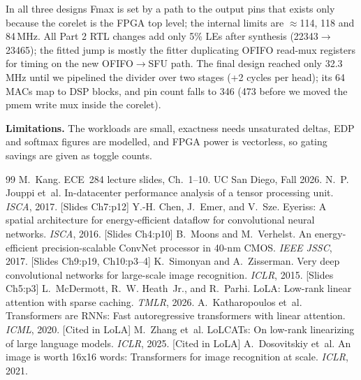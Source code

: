 \documentclass{article}
\begin{document}
In all three designs Fmax is set by a path to the output pins that exists only because the corelet is the FPGA top level; the
internal limits are $\approx$114, 118 and 84\,MHz. All Part 2 RTL changes add only 5\% LEs after synthesis
(\num{22343}$\to$\num{23465}); the fitted jump is mostly the fitter duplicating OFIFO read-mux registers for timing on the
new OFIFO$\to$SFU path. The final design reached
only 32.3\,MHz until we pipelined the divider over two stages (+2 cycles per head); its 64 MACs map to DSP blocks, and pin
count falls to 346 (473 before we moved the pmem write mux inside the corelet).

\textbf{Limitations.} The workloads are small, exactness needs unsaturated deltas, EDP and softmax figures are modelled, and
FPGA power is vectorless, so gating savings are given as toggle counts.

{\small
\begin{thebibliography}{99}\setlength{\itemsep}{1pt}
 M.~Kang. ECE~284 lecture slides, Ch.~1--10. UC San Diego, Fall 2026.
 N.~P. Jouppi et~al. In-datacenter performance analysis of a tensor processing unit. \emph{ISCA}, 2017. [Slides Ch7:p12]
 Y.-H. Chen, J.~Emer, and V.~Sze. Eyeriss: A spatial architecture for energy-efficient dataflow for
convolutional neural networks. \emph{ISCA}, 2016. [Slides Ch4:p10]
 B.~Moons and M.~Verhelst. An energy-efficient precision-scalable {ConvNet} processor in 40-nm {CMOS}.
\emph{IEEE JSSC}, 2017. [Slides Ch9:p19, Ch10:p3--4]
 K.~Simonyan and A.~Zisserman. Very deep convolutional networks for large-scale image recognition.
\emph{ICLR}, 2015. [Slides Ch5:p3]
 L.~McDermott, R.~W. Heath~Jr., and R.~Parhi. {LoLA}: Low-rank linear attention with sparse caching.
\emph{TMLR}, 2026.
 A.~Katharopoulos et~al. Transformers are {RNNs}: Fast autoregressive transformers with linear
attention. \emph{ICML}, 2020. [Cited in LoLA]
 M.~Zhang et~al. {LoLCATs}: On low-rank linearizing of large language models. \emph{ICLR}, 2025. [Cited in LoLA]
 A.~Dosovitskiy et~al. An image is worth 16x16 words: Transformers for image recognition at scale.
\emph{ICLR}, 2021.
\end{thebibliography}
}
\end{document}
